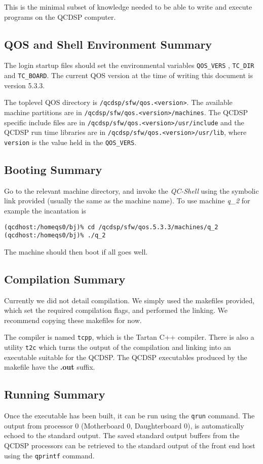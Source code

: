 This is the minimal subset of knowledge needed to be able to write and
execute programs on the QCDSP computer.

\subsection{QOS and Shell Environment Summary}
The login startup files should set the environmental variables {\tt QOS\_VERS}
, {\tt TC\_DIR} and {\tt TC\_BOARD}. The current QOS version at the time
of writing this document is version 5.3.3.

The toplevel QOS directory is {\tt /qcdsp/sfw/qos.<version>}. The 
available machine partitions are in {\tt /qcdsp/sfw/qos.<version>/machines}.
The QCDSP specific include files are in {\tt /qcdsp/sfw/qos.<version>/usr/include} and the QCDSP run time libraries are in {\tt /qcdsp/sfw/qos.<version>/usr/lib}, where {\tt version} is the value held in the {\tt QOS\_VERS}.

\subsection{Booting Summary}
Go to the relevant machine directory, and invoke the {\em QC-Shell} using
the symbolic link provided (usually the same as the machine name). To use
machine {\em q\_2} for example the incantation is 
\begin{verbatim}
(qcdhost:/homeqs0/bj)% cd /qcdsp/sfw/qos.5.3.3/machines/q_2
(qcdhost:/homeqs0/bj)% ./q_2
\end{verbatim}
The machine should then boot if all goes well.

\subsection{Compilation Summary} 
Currently we did not detail compilation. We simply used the 
makefiles provided, which set the required compilation flags,
and performed the linking. We recommend copying these makefiles
for now. 

The compiler is named {\tt tcpp}, which is the Tartan C++ compiler.
There is also a utility {\tt t2c} which turns the output of the 
compilation and linking into an executable suitable for the QCDSP.
The QCDSP executables produced by the makefile have the {\bf .out}
suffix.

\subsection{Running Summary}
Once the executable has been built, it can be run using the {\tt qrun}
command. The output from processor 0 (Motherboard 0, Daughterboard 0),
is automatically echoed to the standard output. The saved standard output
buffers from the QCDSP processors can be retrieved to the standard output
of the front end host using the {\tt qprintf} command. 

